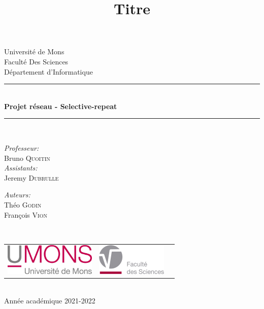 \documentclass{article}
\title{Titre}
\author{ }
\date{ }
\begin{document}
\begin{titlepage}
	\begin{center}

		{\Large Université de Mons}\\[1ex]
		{\Large Faculté Des Sciences}\\[1ex]
		{\Large Département d'Informatique}\\[1ex]

		\newcommand{\HRule}{\rule{\linewidth}{0.3mm}}
		\HRule \\[0.3cm]
		{ \LARGE \bfseries Projet réseau - Selective-repeat \\[0.3cm]}
		\HRule \\[1.5cm]

		\begin{minipage}[t]{0.45\textwidth}
			\begin{flushleft} \large
				\emph{Professeur:}\\
				Bruno \textsc{Quoitin}\\
				\emph{Assistants:}\\
				Jeremy \textsc{Dubrulle}\\
			\end{flushleft}
		\end{minipage}
		\begin{minipage}[t]{0.45\textwidth}
			\begin{flushright} \large
				\emph{Auteurs:} \\
				Théo \textsc{Godin} \\
				François \textsc{Vion} \\
			\end{flushright}
		\end{minipage}\\[2ex]

		\vfill

		\begin{center}
			\begin{tabular}[t]{c c c}
				\includegraphics[height=1.5cm]{ressources/logoumons.jpg} &
				\includegraphics[height=1.5cm]{ressources/logofs.jpg} &
			\end{tabular}
		\end{center}~\\

		{\large Année académique 2021-2022}

	\end{center}
\end{titlepage}
\end{document}
